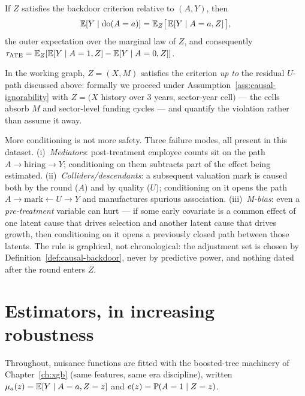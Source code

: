 \begin{theorem}
\label{thm:causal-adjustment}
If $Z$ satisfies the backdoor criterion relative to $(A, Y)$, then
\begin{equation}
\mathbb{E}[Y \mid \mathrm{do}(A = a)] = \mathbb{E}_Z\bigl[\, \mathbb{E}[Y \mid A = a, Z] \,\bigr],
\label{eq:causal-adjustment}
\end{equation}
the outer expectation over the marginal law of $Z$, and consequently
$\tau_{\mathrm{ATE}} = \mathbb{E}_Z[\mathbb{E}[Y \mid A=1, Z] - \mathbb{E}[Y \mid A=0, Z]]$.
\end{theorem}

In the working graph, $Z = (X, M)$ satisfies the criterion \emph{up to} the residual
$U$-path discussed above: formally we proceed under
Assumption~\ref{ass:causal-ignorability} with $Z = (X$ history over 3 years, sector-year
cell$)$ --- the cells absorb $M$ and sector-level funding cycles --- and quantify the
violation rather than assume it away.

\begin{warning}
\label{warn:causal-badcontrols}
More conditioning is not more safety. Three failure modes, all present in this dataset.
(i)~\emph{Mediators}: post-treatment employee counts sit on the path
$A \to \text{hiring} \to Y$; conditioning on them subtracts part of the effect being
estimated. (ii)~\emph{Colliders/descendants}: a subsequent valuation mark is caused
both by the round ($A$) and by quality ($U$); conditioning on it opens the path
$A \to \text{mark} \leftarrow U \to Y$ and manufactures spurious association.
(iii)~\emph{M-bias}: even a \emph{pre-treatment} variable can hurt --- if some early
covariate is a common effect of one latent cause that drives selection and another
latent cause that drives growth, then conditioning on it opens a previously closed path
between those latents. The rule is graphical, not chronological: the adjustment set is
chosen by Definition~\ref{def:causal-backdoor}, never by predictive power, and nothing
dated after the round enters $Z$.
\end{warning}

\section{Estimators, in increasing robustness}
\label{sec:causal-estimators}

Throughout, nuisance functions are fitted with the boosted-tree machinery of
Chapter~\ref{ch:xgb} (same features, same era discipline), written
$\mu_a(z) = \mathbb{E}[Y \mid A = a, Z = z]$ and $e(z) = \mathbb{P}(A = 1 \mid Z = z)$.

